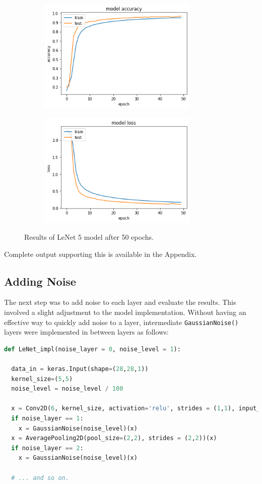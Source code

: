 \documentclass{article}
\begin{document}
\begin{figure}[H]
\centering
\begin{subfigure}
  \centering
  \includegraphics[width=3in]{csci-8920/hw-2/images/accuracy-50.png}
  \label{fig:accuracy-50}
\end{subfigure}%
\begin{subfigure}
  \centering
  \includegraphics[width=3in]{csci-8920/hw-2/images/loss-50.png}
  \label{fig:loss-50}
\end{subfigure}
\caption{Results of LeNet 5 model after 50 epochs.}
\label{fig:default-50}
\end{figure}

Complete output supporting this is available in the  Appendix.

\subsection{Adding Noise} \label{kf}
The next step was to add noise to each layer and evaluate the results. 
This involved a slight adjustment to the model implementation.
Without having an effective way to quickly add noise to a layer, intermediate \lstinline{GaussianNoise()} layers were implemented in between layers as follows:

\begin{lstlisting}[language=Python]
def LeNet_impl(noise_layer = 0, noise_level = 1):

  data_in = keras.Input(shape=(28,28,1))
  kernel_size=(5,5)
  noise_level = noise_level / 100

  x = Conv2D(6, kernel_size, activation='relu', strides = (1,1), input_shape= (28,28,1), padding='same')(data_in)
  if noise_layer == 1:
    x = GaussianNoise(noise_level)(x)
  x = AveragePooling2D(pool_size=(2,2), strides = (2,2))(x)
  if noise_layer == 2:
    x = GaussianNoise(noise_level)(x)

  # ... and so on.
\end{lstlisting}
\end{document}
